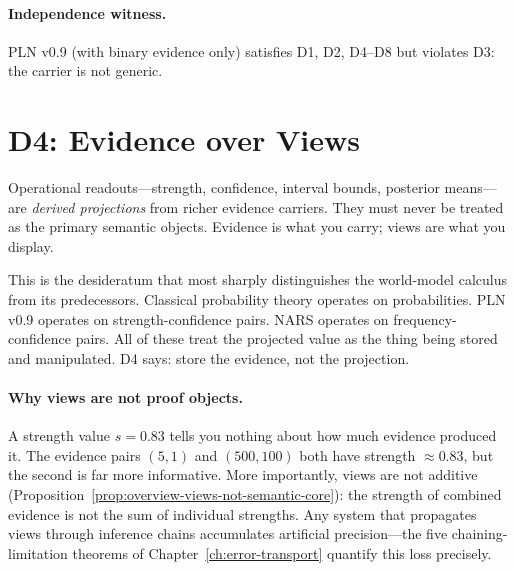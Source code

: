 \paragraph{Independence witness.}
PLN v0.9 (with binary evidence only) satisfies D1, D2, D4--D8 but
violates D3: the carrier is not generic.



\section{D4: Evidence over Views}
\label{sec:d4}

\begin{definition}
\label{def:d4}
Operational readouts---strength, confidence, interval bounds, posterior
means---are \emph{derived projections} from richer evidence carriers.
They must never be treated as the primary semantic objects.  Evidence
is what you carry; views are what you display.
\end{definition}

\noindent
This is the desideratum that most sharply distinguishes the world-model
calculus from its predecessors.  Classical probability theory operates
on probabilities.  PLN v0.9 operates on strength-confidence pairs.
NARS operates on frequency-confidence pairs.  All of these treat the
projected value as the thing being stored and manipulated.  D4 says:
store the evidence, not the projection.

\paragraph{Why views are not proof objects.}
A strength value $s = 0.83$ tells you nothing about how much evidence
produced it.  The evidence pairs $(5, 1)$ and $(500, 100)$ both have
strength $\approx 0.83$, but the second is far more informative.
More importantly, views are not additive
(Proposition~\ref{prop:overview-views-not-semantic-core}): the
strength of combined evidence is not the sum of individual strengths.
Any system that propagates views through inference chains accumulates
artificial precision---the five chaining-limitation theorems of
Chapter~\ref{ch:error-transport} quantify this loss precisely.


